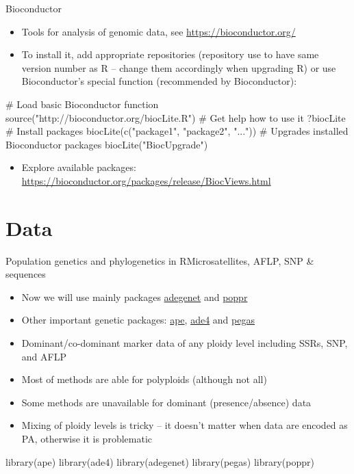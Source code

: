 \documentclass[compress, ucs, xelatex, 11pt, xcolor=svgnames,
  hyperref={
    bookmarks=true,
    unicode=true,
    colorlinks=true,
    pdftitle={Molecular data in R},
    plainpages=false,
    pdfauthor={Vojtech Zeisek},
    pdfsubject={Course about phylogeny and evolution in R},
    pdfcreator={XeLaTeX},
    pdfkeywords={R, evolution, phylogeny, molecular data},
    linkcolor=Tomato,
    anchorcolor=SaddleBrown,
    citecolor=Goldenrod,
    filecolor=DarkMagenta,
    menucolor=Sienna,
    urlcolor=DarkTurquoise,
    pdftex},
  url={hyphens, lowtilde} %
  ]{beamer}
\begin{document}
\begin{frame}[fragile]{Bioconductor}
\begin{itemize}
 \item Tools for analysis of genomic data, see \url{https://bioconductor.org/}
 \item To install it, add appropriate repositories (repository use to have same version number as R -- change them accordingly when upgrading R) or use Bioconductor's special function (recommended by Bioconductor):
\end{itemize}
  \begin{spluscode}
    # Load basic Bioconductor function
    source("http://bioconductor.org/biocLite.R")
    # Get help how to use it
    ?biocLite
    # Install packages
    biocLite(c("package1", "package2", "..."))
    # Upgrades installed Bioconductor packages
    biocLite("BiocUpgrade")
  \end{spluscode}
\begin{itemize}
 \item Explore available packages: \url{https://bioconductor.org/packages/release/BiocViews.html}
\end{itemize}
\end{frame}

\section{Data}

\begin{frame}[fragile]{Population genetics and phylogenetics in R}{Microsatellites, AFLP, SNP \& sequences}
\begin{multicols}{2}
  \begin{itemize}
    \item Now we will use mainly packages \href{http://adegenet.r-forge.r-project.org/}{adegenet} and \href{http://grunwaldlab.cgrb.oregonstate.edu/poppr-r-package-population-genetics}{poppr}
    \item Other important genetic packages: \href{http://ape-package.ird.fr/}{ape}, \href{http://pbil.univ-lyon1.fr/ADE-4/}{ade4} and \href{http://ape-package.ird.fr/pegas.html}{pegas}
    \item Dominant/co-dominant marker data of any ploidy level including SSRs, SNP, and AFLP
    \item Most of methods are able for polyploids (although not all)
    \item Some methods are unavailable for dominant (presence/absence) data
    \item Mixing of ploidy levels is tricky -- it doesn't matter when data are encoded as PA, otherwise it is problematic
  \end{itemize}
  \begin{spluscode}
    library(ape)
    library(ade4)
    library(adegenet)
    library(pegas)
    library(poppr)
  \end{spluscode}
\end{multicols}
\end{frame}
\end{document}
